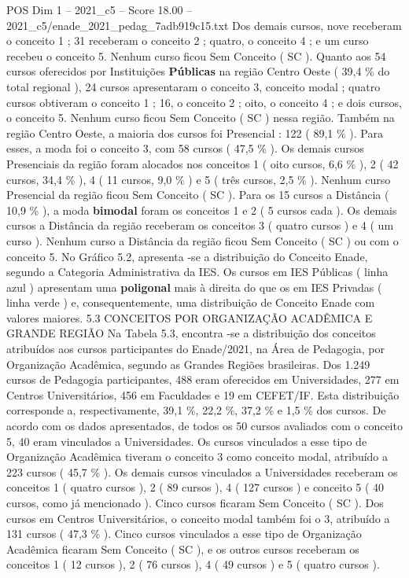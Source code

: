 \begin{textsample}{POS Dim 1 – 2021\_c5 – Score 18.00 – 2021\_c5/enade\_2021\_pedag\_7adb919c15.txt}
Dos demais cursos, nove receberam o conceito 1 ; 31 receberam o conceito 2 ; quatro, o conceito 4 ; e um curso recebeu o conceito 5.
Nenhum curso ficou Sem Conceito ( SC ).
Quanto aos 54 cursos oferecidos por Instituições \textbf{Públicas} na região Centro Oeste ( 39,4 \% do total regional ), 24 cursos apresentaram o conceito 3, conceito modal ; quatro cursos obtiveram o conceito 1 ; 16, o conceito 2 ; oito, o conceito 4 ; e dois cursos, o conceito 5.
Nenhum curso ficou Sem Conceito ( SC ) nessa região.
Também na região Centro Oeste, a maioria dos cursos foi Presencial : 122 ( 89,1 \% ).
Para esses, a moda foi o conceito 3, com 58 cursos ( 47,5 \% ).
Os demais cursos Presenciais da região foram alocados nos conceitos 1 ( oito cursos, 6,6 \% ), 2 ( 42 cursos, 34,4 \% ), 4 ( 11 cursos, 9,0 \% ) e 5 ( três cursos, 2,5 \% ).
Nenhum curso Presencial da região ficou Sem Conceito ( SC ).
Para os 15 cursos a Distância ( 10,9 \% ), a moda \textbf{bimodal} foram os conceitos 1 e 2 ( 5 cursos cada ).
Os demais cursos a Distância da região receberam os conceitos 3 ( quatro cursos ) e 4 ( um curso ).
Nenhum curso a Distância da região ficou Sem Conceito ( SC ) ou com o conceito 5.
No Gráfico 5.2, apresenta -se a distribuição do Conceito Enade, segundo a Categoria Administrativa da IES.
Os cursos em IES Públicas ( linha azul ) apresentam uma \textbf{poligonal} mais à direita do que os em IES Privadas ( linha verde ) e, consequentemente, uma distribuição de Conceito Enade com valores maiores. 5.3 CONCEITOS POR ORGANIZAÇÃO ACADÊMICA E GRANDE REGIÃO Na Tabela 5.3, encontra -se a distribuição dos conceitos atribuídos aos cursos participantes do Enade/2021, na Área de Pedagogia, por Organização Acadêmica, segundo as Grandes Regiões brasileiras.
Dos 1.249 cursos de Pedagogia participantes, 488 eram oferecidos em Universidades, 277 em Centros Universitários, 456 em Faculdades e 19 em CEFET/IF.
Esta distribuição corresponde a, respectivamente, 39,1 \%, 22,2 \%, 37,2 \% e 1,5 \% dos cursos.
De acordo com os dados apresentados, de todos os 50 cursos avaliados com o conceito 5, 40 eram vinculados a Universidades.
Os cursos vinculados a esse tipo de Organização Acadêmica tiveram o conceito 3 como conceito modal, atribuído a 223 cursos ( 45,7 \% ).
Os demais cursos vinculados a Universidades receberam os conceitos 1 ( quatro cursos ), 2 ( 89 cursos ), 4 ( 127 cursos ) e conceito 5 ( 40 cursos, como já mencionado ).
Cinco cursos ficaram Sem Conceito ( SC ).
Dos cursos em Centros Universitários, o conceito modal também foi o 3, atribuído a 131 cursos ( 47,3 \% ).
Cinco cursos vinculados a esse tipo de Organização Acadêmica ficaram Sem Conceito ( SC ), e os outros cursos receberam os conceitos 1 ( 12 cursos ), 2 ( 76 cursos ), 4 ( 49 cursos ) e 5 ( quatro cursos ).

\end{textsample}
